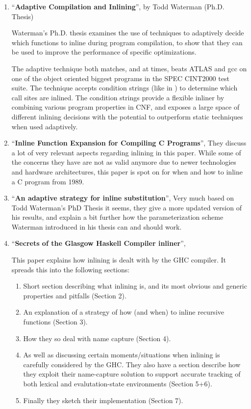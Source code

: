 \begin{enumerate}

	\item ``\textbf{Adaptive Compilation and Inlining}'', by Todd
Waterman (Ph.D. Thesis)

Waterman's Ph.D. thesis \cite{AdaptvCompilAndInlingWaterman} examines the use of
techniques to adaptively decide which functions to inline during program
compilation, to show that they can be used to improve the performance of
specific optimizations.

The adaptive technique both matches, and at times, beats ATLAS  and gcc on one of the object oriented biggest programs in the SPEC
CINT2000 test suite. The technique accepts condition strings (like in
\cite{AutoTuningJavaHeuristics}) to determine which call sites are inlined. The
condition strings provide a flexible inliner by combining various program
properties in CNF, and exposes a large space of different inlining decisions
with the potential to outperform static techniques when used adaptively.

	\item ``\textbf{Inline Function Expansion for Compiling C Programs}'', They
discuss a lot of very relevant aspects regarding inlining in this paper. While
some of the concerns they have are not as valid anymore due to newer
technologies and hardware architectures, this paper is spot on for when and how
to inline a C program from 1989.

	\item ``\textbf{An adaptive strategy for inline substitution}'', Very much
based on Todd Waterman's PhD Thesis it seems, they give a more updated version
of his results, and explain a bit further how the parameterization scheme
Waterman introduced in his thesis can and should work.

	\item ``\textbf{Secrets of the Glasgow Haskell Compiler inliner}'',
\cite{GHCPaper}

This paper explains how inlining is dealt with by the GHC compiler. It spreads
this into the following sections:
\begin{enumerate}
	\item Short section describing what inlining is, and its most obvious and
generic properties and pitfalls (Section 2).
	\item An explanation of a strategy of how (and when) to inline recursive
functions (Section 3).
	\item How they so deal with name capture (Section 4).
	\item As well as discussing certain moments/situations when inlining is
carefully considered by the GHC. They also have a section describe how they
exploit their name-capture solution to support accurate tracking of both lexical
and evalutation-state environments (Section 5+6).
	\item Finally they sketch their implementation (Section 7).
\end{enumerate}


\end{enumerate}
